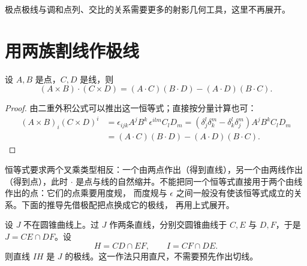 \begin{remark}
极点极线与调和点列、交比的关系需要更多的射影几何工具，这里不再展开。
\end{remark}

\section{用两族割线作极线}

\begin{lemma}[混合型拉格朗日恒等式]
设 $A,B$ 是点，$C,D$ 是线，则
\begin{equation}
(A\times B)\cdot(C\times D)=(A\cdot C)(B\cdot D)-(A\cdot D)(B\cdot C).
\end{equation}
\end{lemma}

\begin{proof}
由二重外积公式可以推出这一恒等式；直接按分量计算也可：
\[
\begin{aligned}
(A\times B)_i(C\times D)^i
&=\epsilon_{ijk}A^jB^k\,\epsilon^{ilm}C_lD_m
=(\delta_j^l\delta_k^m-\delta_k^l\delta_j^m)A^jB^kC_lD_m\\
&=(A\cdot C)(B\cdot D)-(A\cdot D)(B\cdot C).
\end{aligned}
\]
\end{proof}

\begin{remark}
恒等式要求两个叉乘类型相反：一个由两点作出（得到直线），另一个由两线作出（得到点），此时
$\cdot$ 是点与线的自然缩并。不能把同一个恒等式直接用于两个由线作出的点：它们的点乘要用度规，
而度规与 $\epsilon$ 之间一般没有使该恒等式成立的关系。下面的推导先借极配把点换成它的极线，
再用上式展开。
\end{remark}

\begin{example}[用两族割线作极线]
设 $J$ 不在圆锥曲线上。过 $J$ 作两条直线，分别交圆锥曲线于 $C,E$ 与 $D,F$，于是
$J=CE\cap DF$。设
\[
H=CD\cap EF,\qquad I=CF\cap DE .
\]
则直线 $IH$ 是 $J$ 的极线。这一作法只用直尺，不需要预先作出切线。
\end{example}

